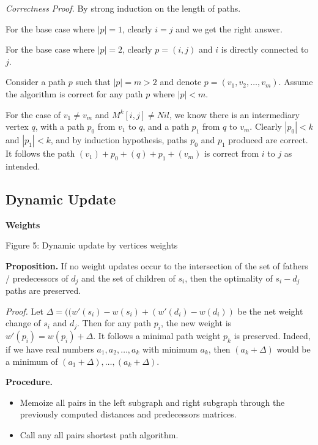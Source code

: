 \textit{Correctness Proof.} By strong induction on the length of paths.

For the base case where $|p| = 1$, clearly $i = j$ and we get the right answer.

For the base case where $|p| = 2$, clearly $p = (i,j)$ and $i$ is directly connected to $j$.

Consider a path $p$ such that $|p| = m > 2$ and denote $p = (v_1, v_2, \dots, v_m)$. Assume the algorithm is correct for any path $p$ where $|p| < m$.

For the case of $v_1 \neq v_m$ and $M^k[i,j] \neq Nil$, we know there is an intermediary vertex $q$, with a path $p_0$ from $v_1$ to $q$, and a path $p_1$ from $q$ to $v_m$. Clearly $|p_0| < k$ and $|p_1| < k$, and by induction hypothesis, paths $p_0$ and $p_1$ produced are correct. It follows the path $(v_1) + p_0 + (q) + p_1 + (v_m)$ is correct from $i$ to $j$ as intended.


\subsection{Dynamic Update}

\textbf{Weights}

\begin{center}
    
    Figure 5: Dynamic update by vertices weights
\end{center}

\textbf{Proposition.} If no weight updates occur to the intersection of the set of fathers / predecessors of $d_j$ and the set of children of $s_i$, then the optimality of $s_i-d_j$ paths are preserved.

\textit{Proof.} Let $\Delta = ((w'(s_i) - w(s_i) + (w'(d_i) - w(d_i))$ be the net weight change of $s_i$ and $d_j$. Then for any path $p_i$, the new weight is $w'(p_i) = w(p_i) + \Delta$. It follows a minimal path weight $p_k$ is preserved. Indeed, if we have real numbers $a_1, a_2, \dots, a_k$ with minimum $a_k$, then $(a_k + \Delta)$ would be a minimum of $(a_1 + \Delta), \dots, (a_k + \Delta)$.

\textbf{Procedure.}
\begin{itemize}
    \item Memoize all pairs in the left subgraph and right subgraph through the previously computed distances and predecessors matrices.
    \item Call any all pairs shortest path algorithm.
\end{itemize}

